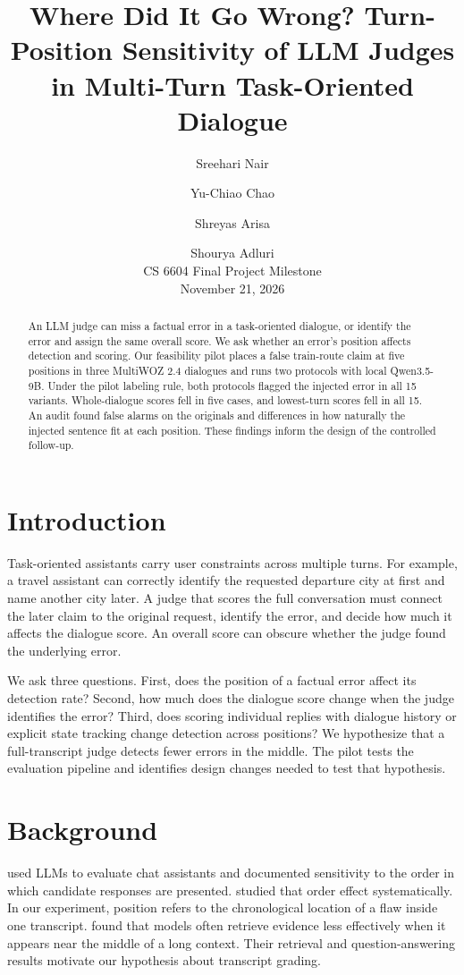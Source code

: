 \documentclass[11pt]{article}
\title{Where Did It Go Wrong? Turn-Position Sensitivity of LLM Judges in Multi-Turn Task-Oriented Dialogue}
\author{Sreehari Nair \and Yu-Chiao Chao \and Shreyas Arisa \and Shourya Adluri \\
  \normalfont CS 6604 Final Project Milestone \\
  \normalfont November 21, 2026}
\begin{document}
\maketitle

\begin{abstract}
An LLM judge can miss a factual error in a task-oriented dialogue, or identify the error and assign the same overall score. We ask whether an error's position affects detection and scoring. Our feasibility pilot places a false train-route claim at five positions in three MultiWOZ 2.4 dialogues and runs two protocols with local Qwen3.5-9B. Under the pilot labeling rule, both protocols flagged the injected error in all 15 variants. Whole-dialogue scores fell in five cases, and lowest-turn scores fell in all 15. An audit found false alarms on the originals and differences in how naturally the injected sentence fit at each position. These findings inform the design of the controlled follow-up.
\end{abstract}

\section{Introduction}

Task-oriented assistants carry user constraints across multiple turns. For example, a travel assistant can correctly identify the requested departure city at first and name another city later. A judge that scores the full conversation must connect the later claim to the original request, identify the error, and decide how much it affects the dialogue score. An overall score can obscure whether the judge found the underlying error.

We ask three questions. First, does the position of a factual error affect its detection rate? Second, how much does the dialogue score change when the judge identifies the error? Third, does scoring individual replies with dialogue history or explicit state tracking change detection across positions? We hypothesize that a full-transcript judge detects fewer errors in the middle. The pilot tests the evaluation pipeline and identifies design changes needed to test that hypothesis.

\section{Background}

\citet{zheng2023judge} used LLMs to evaluate chat assistants and documented sensitivity to the order in which candidate responses are presented. \citet{shi2025judging} studied that order effect systematically. In our experiment, position refers to the chronological location of a flaw inside one transcript. \citet{liu2024lost} found that models often retrieve evidence less effectively when it appears near the middle of a long context. Their retrieval and question-answering results motivate our hypothesis about transcript grading.
\end{document}
